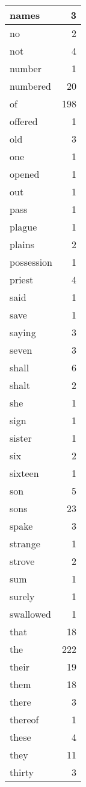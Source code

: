 \begin{center}
\begin{longtable}{l|r}
names & 3\\ \hline 
no & 2\\ \hline 
not & 4\\ \hline 
number & 1\\ \hline 
numbered & 20\\ \hline 
of & 198\\ \hline 
offered & 1\\ \hline 
old & 3\\ \hline 
one & 1\\ \hline 
opened & 1\\ \hline 
out & 1\\ \hline 
pass & 1\\ \hline 
plague & 1\\ \hline 
plains & 2\\ \hline 
possession & 1\\ \hline 
priest & 4\\ \hline 
said & 1\\ \hline 
save & 1\\ \hline 
saying & 3\\ \hline 
seven & 3\\ \hline 
shall & 6\\ \hline 
shalt & 2\\ \hline 
she & 1\\ \hline 
sign & 1\\ \hline 
sister & 1\\ \hline 
six & 2\\ \hline 
sixteen & 1\\ \hline 
son & 5\\ \hline 
sons & 23\\ \hline 
spake & 3\\ \hline 
strange & 1\\ \hline 
strove & 2\\ \hline 
sum & 1\\ \hline 
surely & 1\\ \hline 
swallowed & 1\\ \hline 
that & 18\\ \hline 
the & 222\\ \hline 
their & 19\\ \hline 
them & 18\\ \hline 
there & 3\\ \hline 
thereof & 1\\ \hline 
these & 4\\ \hline 
they & 11\\ \hline 
thirty & 3\\ \hline 

\end{longtable}
\end{center}
